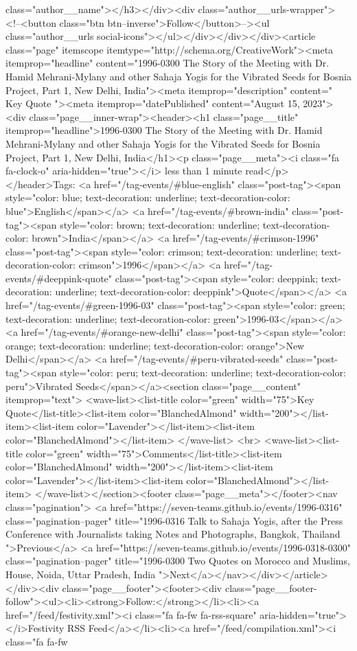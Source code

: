 class="author__name"></h3></div><div class="author__urls-wrapper"> <!--<button class="btn btn--inverse">Follow</button>--><ul class="author__urls social-icons"></ul></div></div></div><article class="page" itemscope itemtype="http://schema.org/CreativeWork"><meta itemprop="headline" content="1996-0300 The Story of the Meeting with Dr. Hamid Mehrani-Mylany and other Sahaja Yogis for the Vibrated Seeds for Bosnia Project, Part 1, New Delhi, India"><meta itemprop="description" content=" Key Quote "><meta itemprop="datePublished" content="August 15, 2023"><div class="page__inner-wrap"><header><h1 class="page__title" itemprop="headline">1996-0300 The Story of the Meeting with Dr. Hamid Mehrani-Mylany and other Sahaja Yogis for the Vibrated Seeds for Bosnia Project, Part 1, New Delhi, India</h1><p class="page__meta"><i class="fa fa-clock-o" aria-hidden="true"></i> less than 1 minute read</p></header>Tags: <a href="/tag-events/#blue-english" class="post-tag"><span style="color: blue; text-decoration: underline; text-decoration-color: blue">English</span></a> <a href="/tag-events/#brown-india" class="post-tag"><span style="color: brown; text-decoration: underline; text-decoration-color: brown">India</span></a> <a href="/tag-events/#crimson-1996" class="post-tag"><span style="color: crimson; text-decoration: underline; text-decoration-color: crimson">1996</span></a> <a href="/tag-events/#deeppink-quote" class="post-tag"><span style="color: deeppink; text-decoration: underline; text-decoration-color: deeppink">Quote</span></a> <a href="/tag-events/#green-1996-03" class="post-tag"><span style="color: green; text-decoration: underline; text-decoration-color: green">1996-03</span></a> <a href="/tag-events/#orange-new-delhi" class="post-tag"><span style="color: orange; text-decoration: underline; text-decoration-color: orange">New Delhi</span></a> <a href="/tag-events/#peru-vibrated-seeds" class="post-tag"><span style="color: peru; text-decoration: underline; text-decoration-color: peru">Vibrated Seeds</span></a><section class="page__content" itemprop="text"> <wave-list><list-title color="green" width="75">Key Quote</list-title><list-item color="BlanchedAlmond" width="200"></list-item><list-item color="Lavender"></list-item><list-item color="BlanchedAlmond"></list-item> </wave-list> <br> <wave-list><list-title color="green" width="75">Comments</list-title><list-item color="BlanchedAlmond" width="200"></list-item><list-item color="Lavender"></list-item><list-item color="BlanchedAlmond"></list-item> </wave-list></section><footer class="page__meta"></footer><nav class="pagination"> <a href="https://seven-teams.github.io/events/1996-0316" class="pagination--pager" title="1996-0316 Talk to Sahaja Yogis, after the Press Conference with Journalists taking Notes and Photographs, Bangkok, Thailand ">Previous</a> <a href="https://seven-teams.github.io/events/1996-0318-0300" class="pagination--pager" title="1996-0300 Two Quotes on Morocco and Muslims, House, Noida, Uttar Pradesh, India ">Next</a></nav></div></article></div><div class="page__footer"><footer><div class="page__footer-follow"><ul><li><strong>Follow:</strong></li><li><a href="/feed/festivity.xml"><i class="fa fa-fw fa-rss-square" aria-hidden="true"></i>Festivity RSS Feed</a></li><li><a href="/feed/compilation.xml"><i class="fa fa-fw 